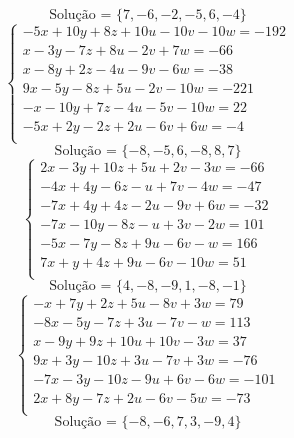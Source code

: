 \documentclass[12pt,oneside,a4paper]{article}
\begin{document}
\begin{equation*}
\text{Solução = }\{7,-6,-2,-5,6,-4\}
\end{equation*}
\vspace{\baselineskip}
\begin{equation*}
\begin{cases}
-5x+10y+8z+10u-10v-10w=-192 \\
x-3y-7z+8u-2v+7w=-66 \\
x-8y+2z-4u-9v-6w=-38 \\
9x-5y-8z+5u-2v-10w=-221 \\
-x-10y+7z-4u-5v-10w=22 \\
-5x+2y-2z+2u-6v+6w=-4 \\
\end{cases}
\end{equation*}
\begin{equation*}
\text{Solução = }\{-8,-5,6,-8,8,7\}
\end{equation*}
\vspace{\baselineskip}
\begin{equation*}
\begin{cases}
2x-3y+10z+5u+2v-3w=-66 \\
-4x+4y-6z-u+7v-4w=-47 \\
-7x+4y+4z-2u-9v+6w=-32 \\
-7x-10y-8z-u+3v-2w=101 \\
-5x-7y-8z+9u-6v-w=166 \\
7x+y+4z+9u-6v-10w=51 \\
\end{cases}
\end{equation*}
\begin{equation*}
\text{Solução = }\{4,-8,-9,1,-8,-1\}
\end{equation*}
\vspace{\baselineskip}
\begin{equation*}
\begin{cases}
-x+7y+2z+5u-8v+3w=79 \\
-8x-5y-7z+3u-7v-w=113 \\
x-9y+9z+10u+10v-3w=37 \\
9x+3y-10z+3u-7v+3w=-76 \\
-7x-3y-10z-9u+6v-6w=-101 \\
2x+8y-7z+2u-6v-5w=-73 \\
\end{cases}
\end{equation*}
\begin{equation*}
\text{Solução = }\{-8,-6,7,3,-9,4\}
\end{equation*}
\end{document}
